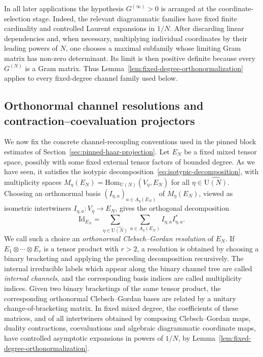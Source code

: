 \documentclass[11pt,a4paper,reqno]{amsart}
\theoremstyle{definition}
\theoremstyle{remark}
\newcommand\U{{\mathrm U}}
\newcommand\Id{{\mathrm{Id}}}
\newcommand\Hom{{\mathrm{Hom}}}
\begin{document}
In all later applications the hypothesis $G^{(\infty)}>0$ is arranged at the coordinate-selection stage. Indeed, the relevant diagrammatic families have fixed finite cardinality and controlled Laurent expansions in $1/N$. After discarding linear dependencies and, when necessary, multiplying individual coordinates by their leading powers of $N$, one chooses a maximal subfamily whose limiting Gram matrix has non-zero determinant. Its limit is then positive definite because every $G^{(N)}$ is a Gram matrix. Thus Lemma~\ref{lem:fixed-degree-orthonormalization} applies to every fixed-degree channel family used below.


\subsection{Orthonormal channel resolutions and contraction--coevaluation projectors}
\label{subsec:orthonormal-channel-recoupling}

We now fix the concrete channel-recoupling conventions used in the pinned block estimates of Section~\ref{sec:pinned-haar-projection}. Let $E_N$ be a fixed mixed tensor space, possibly with some fixed external tensor factors of bounded degree. As we have seen, it satisfies the isotypic decomposition~\eqref{eq:isotypic-decomposition}, with multiplicity spaces $M_\eta(E_N)=\Hom_{\U(N)}(V_\eta,E_N)$ for all $\eta\in\widehat{\U(N)}$. Choosing an orthonormal basis $(I_{\eta,a})_{a\in A_\eta(E_N)}$ of $M_\eta(E_N)$, viewed as isometric intertwiners $I_{\eta,a}:V_\eta\to E_N$, gives the orthogonal decomposition
\[
\Id_{E_N}=
\sum_{\eta\in\widehat{\U(N)}}\sum_{a\in A_\eta(E_N)}I_{\eta,a}I_{\eta,a}^* .
\]
We call such a choice an \emph{orthonormal Clebsch--Gordan resolution} of $E_N$. If $E_1\otimes\cdots\otimes E_r$ is a tensor product with $r>2$, a resolution is obtained by choosing a binary bracketing and applying the preceding decomposition recursively. The internal irreducible labels which appear along the binary channel tree are called \emph{internal channels}, and the corresponding basis indices are called multiplicity indices. Given two binary bracketings of the same tensor product, the corresponding orthonormal Clebsch--Gordan bases are related by a unitary change-of-bracketing matrix. In fixed mixed degree, the coefficients of these matrices, and of all intertwiners obtained by composing Clebsch--Gordan maps, duality contractions, coevaluations and algebraic diagrammatic coordinate maps, have controlled asymptotic expansions in powers of $1/N$, by Lemma~\ref{lem:fixed-degree-orthonormalization}.
\end{document}
